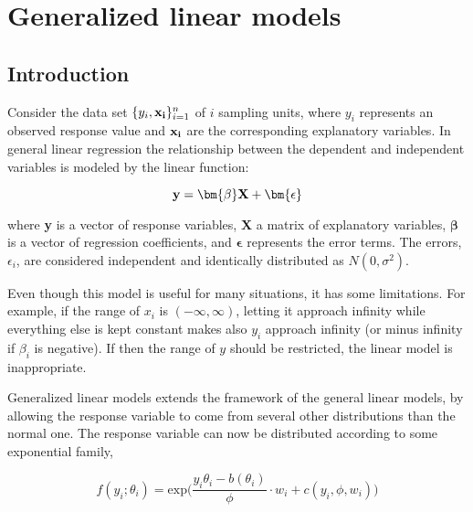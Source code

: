 \section{Generalized linear models}
\label{sec:stats}

\subsection{Introduction}
\label{Intro_GLM}
Consider the data set $ \{y_{i}, \bold{x_{i}}\}_{i=1}^{n} $ of $i$ sampling units, where $y_i$ represents an observed response value and $ \bold{x_i}$ are the corresponding explanatory variables. In general linear regression the relationship between the dependent and independent variables is modeled by the linear function:

\begin{equation}
\label{eq:general}
    \textbf{y} = \bm{\beta}\bf X + \bm{ \epsilon}
\end{equation}

where \textbf{y} is a vector of response variables, \textbf{X} a matrix of explanatory variables, $\bm{\beta}$ is a vector of regression coefficients, and $\bm{ \epsilon}$ represents the error terms. The errors, $\epsilon_{i}$, are considered independent and identically distributed as $N(0, \sigma^{2})$.

Even though this model is useful for many situations, it has some limitations. For example, if the range of $x_{i}$ is $(-\infty, \infty)$, letting it approach infinity while everything else is kept constant makes also $y_i$ approach infinity (or minus infinity if $\beta_i$ is negative). If then the range of $y$ should be restricted, the linear model is inappropriate. 



Generalized linear models extends the framework of the general linear models, by allowing the response variable to come from several other distributions than the normal one. The response variable can now be distributed according to some exponential family, 

\begin{equation}
    f(y_i;\theta_i) = \text{exp}\Big(\frac{y_i \theta_i - b(\theta_i)}{\phi} \cdot w_i + c(y_i,\phi,w_i)\Big)
\end{equation}

